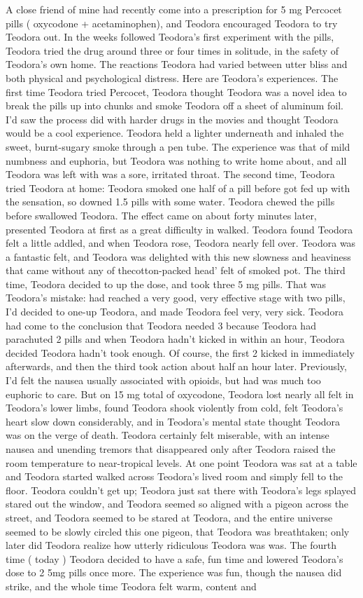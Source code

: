 \documentclass[12pt]{book}
\begin{document}
A close friend of mine had recently come into a prescription for 5 mg Percocet pills ( oxycodone + acetaminophen), and Teodora encouraged Teodora to try Teodora out. In the weeks followed Teodora's first experiment with the pills, Teodora tried the drug around three or four times in solitude, in the safety of Teodora's own home. The reactions Teodora had varied between utter bliss and both physical and psychological distress. Here are Teodora's experiences. The first time Teodora tried Percocet, Teodora thought Teodora was a novel idea to break the pills up into chunks and smoke Teodora off a sheet of aluminum foil. I'd saw the process did with harder drugs in the movies and thought Teodora would be a cool experience. Teodora held a lighter underneath and inhaled the sweet, burnt-sugary smoke through a pen tube. The experience was that of mild numbness and euphoria, but Teodora was nothing to write home about, and all Teodora was left with was a sore, irritated throat. The second time, Teodora tried Teodora at home: Teodora smoked one half of a pill before got fed up with the sensation, so downed 1.5 pills with some water. Teodora chewed the pills before swallowed Teodora. The effect came on about forty minutes later, presented Teodora at first as a great difficulty in walked. Teodora found Teodora felt a little addled, and when Teodora rose, Teodora nearly fell over. Teodora was a fantastic felt, and Teodora was delighted with this new slowness and heaviness that came without any of thecotton-packed head' felt of smoked pot. The third time, Teodora decided to up the dose, and took three 5 mg pills. That was Teodora's mistake: had reached a very good, very effective stage with two pills, I'd decided to one-up Teodora, and made Teodora feel very, very sick. Teodora had come to the conclusion that Teodora needed 3 because Teodora had parachuted 2 pills and when Teodora hadn't kicked in within an hour, Teodora decided Teodora hadn't took enough. Of course, the first 2 kicked in immediately afterwards, and then the third took action about half an hour later. Previously, I'd felt the nausea usually associated with opioids, but had was much too euphoric to care. But on 15 mg total of oxycodone, Teodora lost nearly all felt in Teodora's lower limbs, found Teodora shook violently from cold, felt Teodora's heart slow down considerably, and in Teodora's mental state thought Teodora was on the verge of death. Teodora certainly felt miserable, with an intense nausea and unending tremors that disappeared only after Teodora raised the room temperature to near-tropical levels. At one point Teodora was sat at a table and Teodora started walked across Teodora's lived room and simply fell to the floor. Teodora couldn't get up; Teodora just sat there with Teodora's legs splayed stared out the window, and Teodora seemed so aligned with a pigeon across the street, and Teodora seemed to be stared at Teodora, and the entire universe seemed to be slowly circled this one pigeon, that Teodora was breathtaken; only later did Teodora realize how utterly ridiculous Teodora was was. The fourth time ( today ) Teodora decided to have a safe, fun time and lowered Teodora's dose to 2 5mg pills once more. The experience was fun, though the nausea did strike, and the whole time Teodora felt warm, content and 
\end{document}
